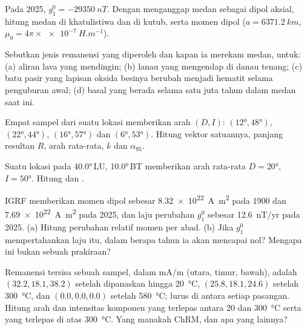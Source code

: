 \begin{exercise}[$\star$]\label{exo:b3:palaeomagnetism:3}
Pada 2025, $g_1^0 = \qty{-29350}{nT}$. Dengan menganggap medan sebagai dipol aksial,
hitung medan di khatulistiwa dan di kutub, serta momen dipol
($a = \qty{6371.2}{km}$, $\mu_0 = 4\pi\times\qty{e-7}{H.m^{-1}}$).
\end{exercise}

\begin{exercise}[$\star$]\label{exo:b3:palaeomagnetism:4}
Sebutkan jenis remanensi yang diperoleh dan kapan ia merekam medan, untuk: (a) aliran
lava yang mendingin; (b) lanau yang mengendap di danau tenang; (c) batu pasir yang
lapisan oksida besinya berubah menjadi hematit selama penguburan awal; (d) basal yang
berada selama satu juta tahun dalam medan saat ini.
\end{exercise}

\begin{exercise}[$\star\star$]\label{exo:b3:palaeomagnetism:5}
Empat sampel dari suatu lokasi memberikan arah $(D, I)$: $(\ang{12}, \ang{48})$,
$(\ang{22}, \ang{44})$, $(\ang{16}, \ang{57})$ dan $(\ang{6}, \ang{53})$.
Hitung vektor satuannya, panjang resultan $R$, arah rata-rata, $k$
dan $\alpha_{95}$.
\end{exercise}

\begin{exercise}[$\star\star$]\label{exo:b3:palaeomagnetism:6}
Suatu lokasi pada \ang{40.0}\,LU, \ang{10.0}\,BT memberikan arah rata-rata $D = \ang{20}$,
$I = \ang{50}$. Hitung  dan .
\end{exercise}

\begin{exercise}[$\star\star$]\label{exo:b3:palaeomagnetism:7}
IGRF memberikan momen dipol sebesar \qty{8.32e22}{A.m^2} pada 1900 dan
\qty{7.69e22}{A.m^2} pada 2025, dan laju perubahan $g_1^0$ sebesar
\qty{+12.6}{nT/yr} pada 2025. (a) Hitung perubahan relatif momen per
abad. (b) Jika $g_1^0$ mempertahankan laju itu, dalam berapa tahun ia akan mencapai nol?
Mengapa ini bukan sebuah prakiraan?
\end{exercise}

\begin{exercise}[$\star\star$]\label{exo:b3:palaeomagnetism:8}
Remanensi tersisa sebuah sampel, dalam \unit{mA/m} (utara, timur, bawah), adalah
$(32.2, 18.1, 38.2)$ setelah dipanaskan hingga \qty{20}{\celsius}, $(25.8, 18.1, 24.6)$
setelah \qty{300}{\celsius}, dan $(0.0, 0.0, 0.0)$ setelah \qty{580}{\celsius};
 lurus di antara setiap pasangan. Hitung arah dan
intensitas komponen yang terlepas antara 20 dan \qty{300}{\celsius} serta yang
terlepas di atas \qty{300}{\celsius}. Yang manakah ChRM, dan apa yang
lainnya?
\end{exercise}


